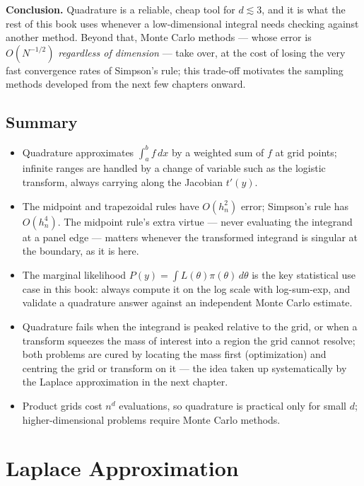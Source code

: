 \documentclass[
  letterpaper,
  DIV=11,
  numbers=noendperiod]{scrreprt}
\providecommand{\tightlist}{%
  \setlength{\itemsep}{0pt}\setlength{\parskip}{0pt}}
\begin{document}
\textbf{Conclusion.} Quadrature is a reliable, cheap tool for
\(d \lesssim 3\), and it is what the rest of this book uses whenever a
low-dimensional integral needs checking against another method. Beyond
that, Monte Carlo methods --- whose error is \(O(N^{-1/2})\)
\emph{regardless of dimension} --- take over, at the cost of losing the
very fast convergence rates of Simpson's rule; this trade-off motivates
the sampling methods developed from the next few chapters onward.

\section{Summary}\label{summary-2}

\begin{itemize}
\tightlist
\item
  Quadrature approximates \(\int_a^b f\,dx\) by a weighted sum of \(f\)
  at grid points; infinite ranges are handled by a change of variable
  such as the logistic transform, always carrying along the Jacobian
  \(t'(y)\).
\item
  The midpoint and trapezoidal rules have \(O(h_n^2)\) error; Simpson's
  rule has \(O(h_n^4)\). The midpoint rule's extra virtue --- never
  evaluating the integrand at a panel edge --- matters whenever the
  transformed integrand is singular at the boundary, as it is here.
\item
  The marginal likelihood \(P(y) = \int L(\theta)\pi(\theta)\,d\theta\)
  is the key statistical use case in this book: always compute it on the
  log scale with log-sum-exp, and validate a quadrature answer against
  an independent Monte Carlo estimate.
\item
  Quadrature fails when the integrand is peaked relative to the grid, or
  when a transform squeezes the mass of interest into a region the grid
  cannot resolve; both problems are cured by locating the mass first
  (optimization) and centring the grid or transform on it --- the idea
  taken up systematically by the Laplace approximation in the next
  chapter.
\item
  Product grids cost \(n^d\) evaluations, so quadrature is practical
  only for small \(d\); higher-dimensional problems require Monte Carlo
  methods.
\end{itemize}


\chapter{Laplace Approximation}\label{laplace-approximation}
\end{document}
